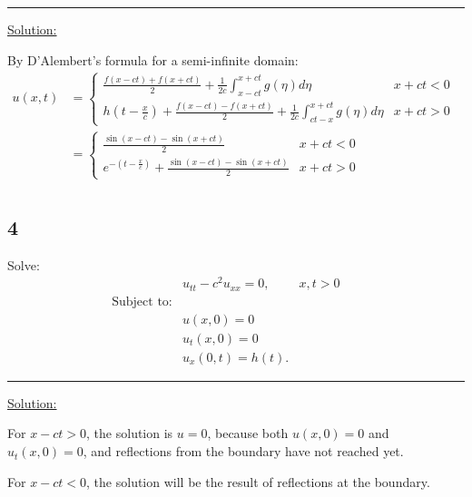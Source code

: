 \documentclass{article}
\begin{document}
\begin{center}
  \noindent\rule{8cm}{0.4pt}
\end{center}

\underline{Solution:}

By D'Alembert's formula for a semi-infinite domain:
\begin{align*}
  u(x,t) 
  &= \begin{cases}
    \frac{f(x-ct) + f(x+ct)}{2} + \frac{1}{2c} \int_{x-ct}^{x+ct} g(\eta) d\eta & x+ct < 0 \\
    h(t-\frac{x}{c}) + \frac{f(x-ct) - f(x+ct)}{2} + \frac{1}{2c} \int_{ct-x}^{x+ct} g(\eta) d\eta & x+ct > 0
  \end{cases} &&\\
  &= \begin{cases}
    \frac{\sin(x-ct) - \sin(x+ct)}{2} & x+ct < 0 \\
    e^{-(t-\frac{x}{c})} + \frac{\sin(x-ct) - \sin(x+ct)}{2} & x+ct > 0
  \end{cases} &&\\
\end{align*}

\newpage

\subsection*{4}
Solve:
\begin{align*}
  &u_{tt} - c^2 u_{xx} = 0,  &x,t > 0 &&\\
  \text{Subject to:} \\
  &u(x,0) = 0 &&\\
  &u_t(x,0) = 0 &&\\
  &u_x(0,t) = h(t).
\end{align*}

\begin{center}
  \noindent\rule{8cm}{0.4pt}
\end{center}

\underline{Solution:}

For $x-ct > 0$, the solution is $u = 0$, because both $u(x,0) = 0$ and $u_t(x,0) = 0$, and reflections from the boundary have not reached yet.
\newline

For $x-ct < 0$, the solution will be the result of reflections at the boundary.
\end{document}
